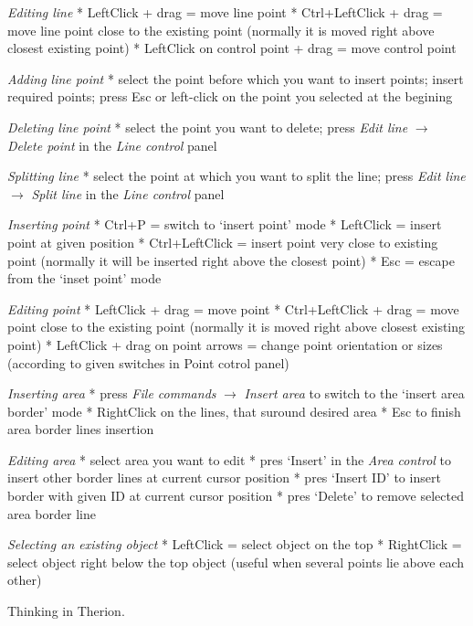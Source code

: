 {\it Editing line}
\list
 * LeftClick + drag = move line point
 * Ctrl+LeftClick + drag = move line point close to the existing
    point (normally it is moved right above closest existing point)
 * LeftClick on control point + drag = move control point
\endlist

{\it Adding line point}
\list
  * select the point before which you want to insert points;
    insert required points;
    press Esc or left-click on the point you selected at the begining
\endlist
  
{\it Deleting line point}
\list
  * select the point you want to delete;
    press {\it Edit line} $\to$ {\it Delete point} in the {\it Line control} 
    panel
\endlist

{\it Splitting line}
\list
 * select the point at which you want to split the line;
    press {\it Edit line} $\to$ {\it Split line} in the {\it Line control} 
    panel
\endlist


{\it Inserting point}
\list
 * Ctrl+P = switch to `insert point' mode
 * LeftClick = insert point at given position
 * Ctrl+LeftClick = insert point very close to existing point (normally it
    will be inserted right above the closest point)
 * Esc = escape from the `inset point' mode
\endlist

{\it Editing point}
\list
 * LeftClick + drag = move point
 * Ctrl+LeftClick + drag = move point close to the existing
    point (normally it is moved right above closest existing point)
 * LeftClick + drag on point arrows = change point orientation or
    sizes (according to given switches in Point cotrol panel)
\endlist

{\it Inserting area}
\list
 * press {\it File commands} $\to$ {\it Insert area} to switch to the 
   `insert area border' mode
 * RightClick on the lines, that suround desired area
 * Esc to finish area border lines insertion
\endlist

{\it Editing area}
\list
 * select area you want to edit
 * pres `Insert' in the {\it Area control} to insert other border lines
    at current cursor position
 * pres `Insert ID' to insert border with given ID at current cursor position
 * pres `Delete' to remove selected area border line
\endlist


{\it Selecting an existing object}
\list
 * LeftClick = select object on the top
 * RightClick = select object right below the top object (useful when several
    points lie above each other)
\endlist



\subchapter Thinking in Therion.

